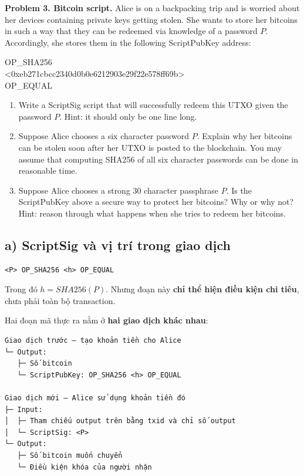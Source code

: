 
\begin{summarybox}
\textbf{Problem 3. Bitcoin script.}
Alice is on a backpacking trip and is worried about her devices containing
private keys getting stolen. She wants to store her bitcoins in such a way
that they can be redeemed via knowledge of a password $P$. Accordingly, she
stores them in the following ScriptPubKey address:
\begin{center}
\normalfont\ttfamily
OP\_SHA256\\
<0xeb271cbcc2340d0b0e6212903e29f22e578ff69b>\\
OP\_EQUAL
\end{center}
\begin{enumerate}[label=\alph*.,leftmargin=1.5em]
  \item Write a ScriptSig script that will successfully redeem this UTXO
        given the password $P$. Hint: it should only be one line long.
  \item Suppose Alice chooses a six character password $P$. Explain why her
        bitcoins can be stolen soon after her UTXO is posted to the
        blockchain. You may assume that computing SHA256 of all six character
        passwords can be done in reasonable time.
  \item Suppose Alice chooses a strong 30 character passphrase $P$. Is the
        ScriptPubKey above a secure way to protect her bitcoins? Why or why
        not? Hint: reason through what happens when she tries to redeem her
        bitcoins.
\end{enumerate}
\end{summarybox}

\solution

\subsection*{a) ScriptSig và vị trí trong giao dịch}

\begin{verbatim}
<P> OP_SHA256 <h> OP_EQUAL
\end{verbatim}

Trong đó $h = SHA256(P)$. Nhưng đoạn này \textbf{chỉ thể hiện điều kiện chi
tiêu}, chưa phải toàn bộ transaction.

Hai đoạn mã thực ra nằm ở \textbf{hai giao dịch khác nhau}:

\begin{samepage}
\begin{verbatim}
Giao dịch trước — tạo khoản tiền cho Alice
└─ Output:
   ├─ Số bitcoin
   └─ ScriptPubKey: OP_SHA256 <h> OP_EQUAL

Giao dịch mới — Alice sử dụng khoản tiền đó
├─ Input:
│  ├─ Tham chiếu output trên bằng txid và chỉ số output
│  └─ ScriptSig: <P>
└─ Output:
   ├─ Số bitcoin muốn chuyển
   └─ Điều kiện khóa của người nhận
\end{verbatim}
\end{samepage}


